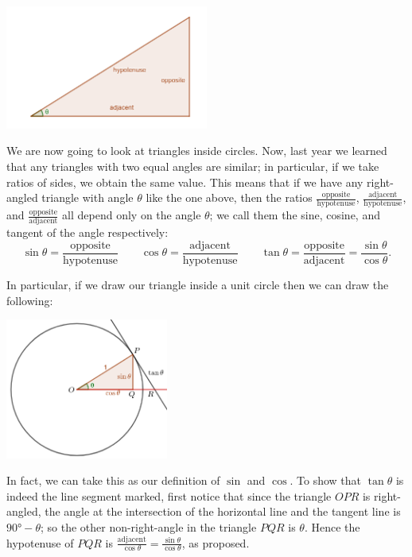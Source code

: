



\begin{center}
  \includegraphics[width=0.5\textwidth]{trig}
\end{center}
We are now going to look at triangles inside circles. Now, last year we learned that any triangles with two equal angles are similar; in particular,
if we take ratios of sides, we obtain the same value. This means that if we have any right-angled triangle with angle $ \theta $ like the one above,
then the ratios $ \frac{\text{opposite}}{\text{hypotenuse}} $, $ \frac{\text{adjacent}}{\text{hypotenuse}} $, and $ \frac{\text{opposite}}{\text{adjacent}} $
all depend only on the angle $ \theta $; we call them the sine, cosine, and tangent of the angle respectively:
\begin{displaymath}
  \sin \theta = \frac{\text{opposite}}{\text{hypotenuse}}\qquad \cos \theta = \frac{\text{adjacent}}{\text{hypotenuse}} \qquad \tan \theta = \frac{\text{opposite}}{\text{adjacent}} = \frac{\sin\theta}{\cos\theta}.
\end{displaymath}

In particular, if we draw our triangle inside a unit circle then we can draw the following:
\begin{center}
  \includegraphics[width=0.4\textwidth]{trigfns}
\end{center}
In fact, we can take this as our definition of $ \sin $ and $ \cos $. To show that $ \tan \theta $ is indeed the line segment marked,
first notice that since the triangle $ OPR $ is right-angled, the angle at the intersection of the horizontal line and the tangent line
is $ \ang{90} - \theta $; so the other non-right-angle in the triangle $ PQR $ is $ \theta $. Hence the hypotenuse of $ PQR $
is $ \frac{\text{adjacent}}{\cos \theta} = \frac{\sin\theta}{\cos\theta} $, as proposed.

